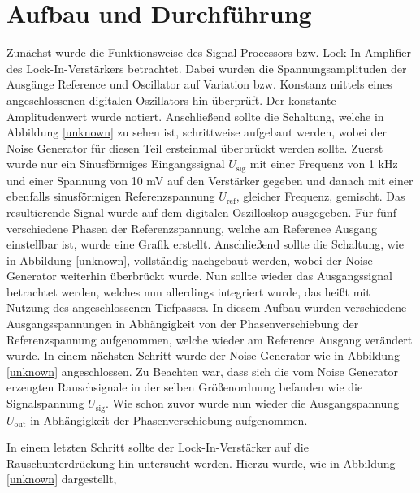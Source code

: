 \section{Aufbau und Durchführung}
\label{sec:Durchführung}
Zunächst wurde die Funktionsweise des Signal Processors bzw. Lock-In Amplifier des Lock-In-Verstärkers betrachtet.
Dabei wurden die Spannungsamplituden der Ausgänge Reference und Oscillator
auf Variation bzw. Konstanz mittels eines angeschlossenen digitalen Oszillators hin
überprüft. Der konstante Amplitudenwert wurde notiert.
Anschließend sollte die Schaltung, welche in Abbildung \ref{unknown} zu sehen ist, schrittweise aufgebaut werden, wobei der Noise Generator für diesen
Teil ersteinmal überbrückt werden sollte. Zuerst wurde nur ein Sinusförmiges Eingangssignal $U_\text{sig}$ mit einer Frequenz von 1 kHz und einer Spannung von 10 mV auf den
Verstärker gegeben und danach mit einer ebenfalls sinusförmigen Referenzspannung $U_\text{ref}$, gleicher Frequenz, gemischt. Das resultierende Signal wurde auf dem digitalen Oszilloskop
ausgegeben. Für fünf verschiedene Phasen der Referenzspannung, welche am Reference Ausgang einstellbar ist, wurde eine Grafik erstellt.
Anschließend sollte die Schaltung, wie in Abbildung \ref{unknown}, vollständig nachgebaut werden, wobei der Noise Generator weiterhin überbrückt wurde.
Nun sollte wieder das Ausgangssignal betrachtet werden, welches nun allerdings integriert wurde, das heißt mit Nutzung des angeschlossenen Tiefpasses. In diesem Aufbau wurden verschiedene Ausgangsspannungen 
in Abhängigkeit von der Phasenverschiebung der Referenzspannung aufgenommen, welche wieder am Reference Ausgang verändert wurde.
In einem nächsten Schritt wurde der Noise Generator wie in Abbildung \ref{unknown} angeschlossen. Zu Beachten war, dass sich die vom Noise Generator erzeugten Rauschsignale in der
selben Größenordnung befanden wie die Signalspannung $U_\text{sig}$. Wie schon zuvor wurde nun wieder die Ausgangspannung $U_\text{out}$ in Abhängigkeit der Phasenverschiebung aufgenommen.

In einem letzten Schritt sollte der Lock-In-Verstärker auf die Rauschunterdrückung hin untersucht werden.
Hierzu wurde, wie in Abbildung \ref{unknown} dargestellt, 

